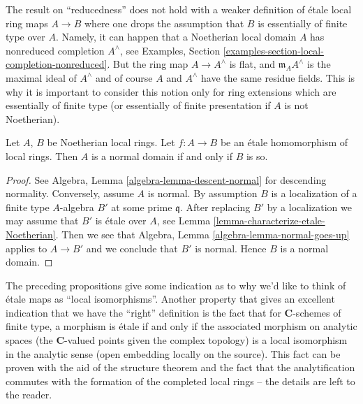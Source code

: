 \begin{remark}
\label{remark-technicality-needed}
The result on ``reducedness'' does not hold with a weaker
definition of \'etale local ring maps $A \to B$ where one
drops the assumption that $B$ is essentially of finite type over $A$.
Namely, it can happen that a Noetherian local domain $A$ has nonreduced
completion $A^\wedge$, see
Examples, Section \ref{examples-section-local-completion-nonreduced}.
But the ring map $A \to A^\wedge$ is flat, and $\mathfrak m_AA^\wedge$
is the maximal ideal of $A^\wedge$ and of course $A$ and $A^\wedge$ have
the same residue fields. This is why it is important to consider
this notion only for ring extensions which are essentially of finite type
(or essentially of finite presentation if $A$ is not Noetherian).
\end{remark}

\begin{proposition}
\label{proposition-etale-normal}
\begin{reference}
\cite[Expose I, Theorem 9.5 part (i)]{SGA1}
\end{reference}
Let $A$, $B$ be Noetherian local rings.
Let $f : A \to B$ be an \'etale homomorphism of local rings.
Then $A$ is a normal domain if and only if $B$ is so.
\end{proposition}

\begin{proof}
See
Algebra, Lemma \ref{algebra-lemma-descent-normal}
for descending normality. Conversely, assume $A$ is normal.
By assumption $B$ is a localization of a finite type $A$-algebra
$B'$ at some prime $\mathfrak q$. After replacing $B'$ by a localization
we may assume that $B'$ is \'etale over $A$, see
Lemma \ref{lemma-characterize-etale-Noetherian}.
Then we see that
Algebra, Lemma \ref{algebra-lemma-normal-goes-up}
applies to $A \to B'$ and we conclude that $B'$ is normal.
Hence $B$ is a normal domain.
\end{proof}

\noindent
The preceding propositions give some indication as to why we'd like to think
of \'etale maps as ``local isomorphisms''. Another property that gives an
excellent indication that we have the ``right'' definition is the fact that
for $\mathbf{C}$-schemes of finite type, a morphism is \'etale if and only if
the associated morphism on analytic spaces (the $\mathbf{C}$-valued points given
the complex topology) is a local isomorphism in the analytic sense (open
embedding locally on the source). This fact can be proven with the aid of the
structure theorem and the fact that the analytification commutes with the
formation of the completed local rings -- the details are left to the reader.








